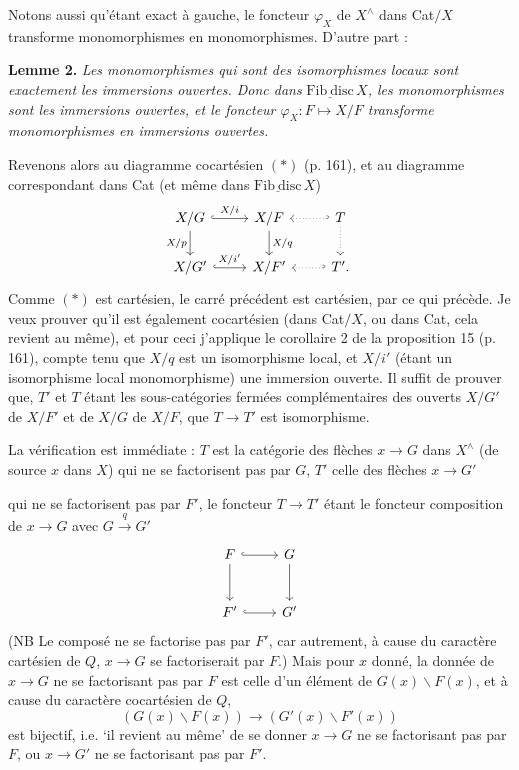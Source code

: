 \documentclass[11pt]{article}
\newcommand{\printedpage}[1]{\marginpar{\footnotesize p.~#1}}
\newcommand{\msp}[1]{\marginpar{\footnotesize [#1]}}
\newcommand{\Fibdisc}{\underline{\mathrm{Fib\ disc}}}
\begin{document}
\msp{page 165}
Notons aussi qu'étant exact à gauche, le foncteur $\varphi_X$ de $X^{\wedge}$ dans Cat$/X$ transforme monomorphismes en monomorphismes. D'autre part :

\textbf{Lemme 2.} \textit{Les monomorphismes qui sont des isomorphismes locaux sont exactement les immersions ouvertes. Donc dans} $\Fibdisc\, X$\textit{, les monomorphismes sont les immersions ouvertes, et le foncteur $\varphi_X : F \longmapsto X/F$ transforme monomorphismes en immersions ouvertes.}

Revenons alors au diagramme cocartésien $(*)$ (p. 161), et au diagramme correspondant dans Cat (et même dans $\Fibdisc\, X$)
\[
\begin{tikzcd}
X/G \ar[r, hook, "X/i"] \ar[d, "X/p"'] & X/F \ar[d, "X/q"] & T \ar[l, hook', dotted] \ar[d, dotted] \\
X/G' \ar[r, hook, "X/i'"] & X/F' & T'. \ar[l, hook', dotted]
\end{tikzcd}
\]
Comme $(*)$ est cartésien, le carré précédent est cartésien, par ce qui précède. Je veux prouver qu'il est également cocartésien
\msp{page 166}
(dans Cat$/X$, ou dans Cat, cela revient au même), et pour ceci j'applique le corollaire 2 de la proposition 15 (p. 161), compte tenu que $X/q$ est un isomorphisme local, et $X/i'$ (étant un isomorphisme local monomorphisme) une immersion ouverte. Il suffit de prouver que, $T'$ et $T$ étant les sous-catégories fermées complémentaires des ouverts $X/G'$ de $X/F'$ et de $X/G$ de $X/F$, que $T \longrightarrow T'$ est isomorphisme.


La vérification est immédiate : $T$ est la catégorie des flèches $x \longrightarrow G$ dans $X^{\wedge}$ (de source $x$ dans $X$) qui ne se factorisent pas par $G$, $T'$ celle des flèches $x \longrightarrow G'$

\printedpage{113}
qui ne se factorisent pas par $F'$, le foncteur $T \longrightarrow T'$ étant le foncteur composition de $x \longrightarrow G$ avec $G \xrightarrow{q} G'$
\[
\begin{tikzcd}[row sep=large]
F \arrow[r, hook] \arrow[d] & G \arrow[d] \\
F' \arrow[r, hook] & G'
\end{tikzcd}
\]
(NB Le composé ne se factorise pas par $F'$, car autrement, à cause du caractère cartésien de $Q$, $x \longrightarrow G$ se factoriserait par $F$.) Mais pour $x$ donné, la donnée de $x \longrightarrow G$ ne se factorisant pas par $F$ est celle d’un élément \msp{page 167} de $G(x)\backslash F(x)$, et à cause du caractère cocartésien de $Q$,
\[
(G(x)\backslash F(x)) \longrightarrow (G'(x)\backslash F'(x))
\]
est bijectif, i.e. ‘il revient au même’ de se donner $x \longrightarrow G$ ne se factorisant pas par $F$, ou $x \longrightarrow G'$ ne se factorisant pas par $F'$.
\end{document}
